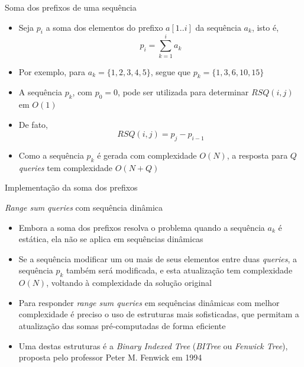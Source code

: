 \begin{frame}[fragile]{Soma dos prefixos de uma sequência}

    \begin{itemize}
        \item Seja $p_i$ a soma dos elementos do prefixo $a[1..i]$ da sequência $a_k$, isto é,
        \[
            p_i = \sum_{k = 1}^i a_k
        \]

        \item Por exemplo, para $a_k = \lbrace 1, 2, 3, 4, 5\rbrace$, segue que
            $p_k = \lbrace 1, 3, 6, 10, 15\rbrace$

        \item A sequência $p_k$, com $p_0 = 0$, pode ser utilizada para determinar $RSQ(i, j)$
            em $O(1)$

        \item De fato,
        \[
            RSQ(i, j) = p_j - p_{i - 1}
        \]

        \item Como a sequência $p_k$ é gerada com complexidade $O(N)$, a resposta para $Q$ 
            \textit{queries} tem complexidade $O(N + Q)$
    \end{itemize}

\end{frame}

\begin{frame}[fragile]{Implementação da soma dos prefixos}
\end{frame}

\begin{frame}[fragile]{{\it Range sum queries} com sequência dinâmica}

    \begin{itemize}
        \item Embora a soma dos prefixos resolva o problema quando a sequência $a_k$ é 
            estática, ela não se aplica em sequências dinâmicas

        \item Se a sequência modificar um ou mais de seus elementos entre duas \textit{queries},
            a sequência $p_k$ também será modificada, e esta atualização tem complexidade $O(N)$,
            voltando à complexidade da solução original

        \item Para responder \textit{range sum queries} em sequências dinâmicas com melhor
            complexidade
            é preciso o uso de estruturas mais sofisticadas, que permitam a atualização das
            somas pré-computadas de forma eficiente

        \item Uma destas estruturas é a \textit{Binary Indexed Tree} (\textit{BITree} ou 
            \textit{Fenwick Tree}), proposta pelo professor Peter M. Fenwick em 1994
    \end{itemize}

\end{frame}
